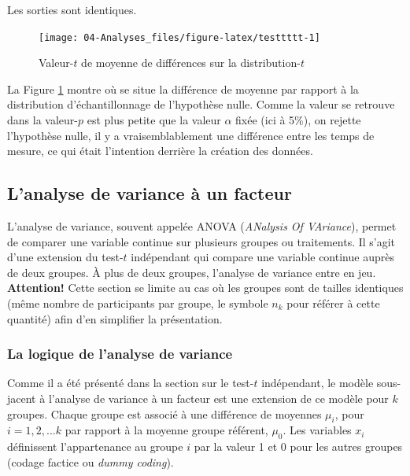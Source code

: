 \documentclass[
]{book}
\begin{document}
Les sorties sont identiques.

\begin{figure}

{\centering \texttt{[image: 04-Analyses\_files/figure-latex/testtttt-1]} 

}

\caption{Valeur-$t$ de moyenne de différences sur la distribution-$t$}\label{fig:testtttt}
\end{figure}

La Figure \ref{fig:testtttt} montre où se situe la différence de moyenne par rapport à la distribution d'échantillonnage de l'hypothèse nulle. Comme la valeur se retrouve dans la valeur-\(p\) est plus petite que la valeur \(\alpha\) fixée (ici à 5\%), on rejette l'hypothèse nulle, il y a vraisemblablement une différence entre les temps de mesure, ce qui était l'intention derrière la création des données.

\hypertarget{lanalyse-de-variance-uxe0-un-facteur}{%
\subsection{L'analyse de variance à un facteur}\label{lanalyse-de-variance-uxe0-un-facteur}}

L'analyse de variance, souvent appelée ANOVA (\emph{ANalysis Of VAriance}), permet de comparer une variable continue sur plusieurs groupes ou traitements. Il s'agit d'une extension du test-\(t\) indépendant qui compare une variable continue auprès de deux groupes. À plus de deux groupes, l'analyse de variance entre en jeu. \textbf{Attention!} Cette section se limite au cas où les groupes sont de tailles identiques (même nombre de participants par groupe, le symbole \(n_k\) pour référer à cette quantité) afin d'en simplifier la présentation.

\hypertarget{la-logique-de-lanalyse-de-variance}{%
\subsubsection{La logique de l'analyse de variance}\label{la-logique-de-lanalyse-de-variance}}

Comme il a été présenté dans la section sur le test-\(t\) indépendant, le modèle sous-jacent à l'analyse de variance à un facteur est une extension de ce modèle pour \(k\) groupes. Chaque groupe est associé à une différence de moyennes \(\mu_i\), pour \(i = 1,2, ...k\) par rapport à la moyenne groupe référent, \(\mu_0\). Les variables \(x_i\) définissent l'appartenance au groupe \(i\) par la valeur 1 et 0 pour les autres groupes (codage factice ou \emph{dummy coding}).
\end{document}
